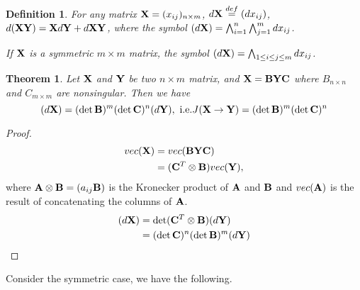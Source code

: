 \documentclass[11pt]{article}
\def\A{{\bf A}}
\def\B{{\bf B}}
\def\C{{\bf C}}
\def\X{{\bf X}}
\def\Y{{\bf Y}}
\newtheorem{theorem}{Theorem}[section]
\newtheorem{definition}{Definition}[section]
\begin{document}
\begin{definition}
	For any matrix $\X = (x_{ij})_{n\times m}$, $d\X\overset{def}{=} (dx_{ij})$,
	$d(\X\Y) = \X d\Y+d\X\Y$,
	where the symbol $(d\X) = \bigwedge_{i=1}^n\bigwedge_{j=1}^m dx_{ij}$.

	If $\X$ is a symmetric $m\times m$ matrix, the symbol $(d\X) = \bigwedge_{1\leq i\leq j\leq m} dx_{ij}$.
\end{definition}

\begin{theorem} \label{thm:asym}
	Let $\X$ and $\Y$ be two $n\times m$ matrix, and $\X = \B\Y\C$ where $B_{n\times n}$ and $C_{m\times m}$ are nonsingular. Then we have
	\begin{equation}
		(d\X) = (\det\B)^m(\det\C)^n(d\Y), \text{\ i.e.}\\
		J(\X\rightarrow \Y) =  (\det\B)^m(\det\C)^n\\
	\end{equation} 
\end{theorem}
\begin{proof}
	\begin{align}
		vec(\X) 	&= vec(\B\Y\C)\\
				&= (\C^T \otimes \B) vec(\Y),
	\end{align}
	where $\A\otimes \B = (a_{ij}\B)$ is the Kronecker product of $\A$ and $\B$ and $vec(\A)$ is the result of concatenating the columns of $\A$.
	\begin{align}
		(d\X) 	&= \det(\C^T \otimes \B) (d\Y)\\
				&= (\det\C)^n(\det\B)^m (d\Y)\\
	\end{align}
\end{proof}

Consider the symmetric case, we have the following.
\end{document}
